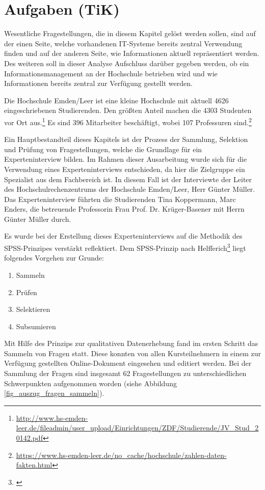 \section{Aufgaben (TiK)}
Wesentliche Fragestellungen, die in diesem Kapitel gelöst werden sollen, sind auf der einen Seite, welche vorhandenen IT-Systeme bereits zentral Verwendung finden und auf der anderen Seite, wie Informationen aktuell repräsentiert werden. Des weiteren soll in dieser Analyse Aufschluss darüber gegeben werden, ob ein Informationsmanagement an der Hochschule betrieben wird und wie Informationen bereits zentral zur Verfügung gestellt werden.

Die Hochschule Emden/Leer ist eine kleine Hochschule mit aktuell 4626 eingeschriebenen Studierenden. Den größten Anteil machen die 4303 Studenten vor Ort aus.\footnote{\url{http://www.hs-emden-leer.de/fileadmin/user_upload/Einrichtungen/ZDF/Studierende/JV_Stud_20142.pdf}} Es sind 396 Mitarbeiter beschäftigt, wobei 107 Professuren sind.\footnote{\url{https://www.hs-emden-leer.de/no_cache/hochschule/zahlen-daten-fakten.html}}

Ein Hauptbestandteil dieses Kapitels ist der Prozess der Sammlung, Selektion und Prüfung von Fragestellungen, welche die Grundlage für ein Experteninterview bilden. Im Rahmen dieser Ausarbeitung wurde sich für die Verwendung eines Experteninterviews entschieden, da hier die Zielgruppe ein Spezialist aus dem Fachbereich ist. In diesem Fall ist der Interviewte der Leiter des Hochschulrechenzentrums der Hochschule Emden/Leer, Herr Günter Müller. Das Experteninterview führten die Studierenden Tina Koppermann, Marc Enders, die betreuende Professorin Frau Prof. Dr. Krüger-Basener mit Herrn Günter Müller durch. 

Es wurde bei der Erstellung dieses Experteninterviews auf die Methodik des SPSS-Prinzipes verstärkt reflektiert. Dem SPSS-Prinzip nach Helfferich\footnote{\cite{helfferich_2009}} liegt folgendes Vorgehen zur Grunde:

\begin{enumerate}
	\item Sammeln
	\item Prüfen
	\item Selektieren
	\item Subsumieren		
\end{enumerate}

Mit Hilfe des Prinzips zur qualitativen Datenerhebung fand im ersten Schritt das Sammeln von Fragen statt. Diese konnten von allen Kursteilnehmern in einem zur Verfügung gestellten Online-Dokument eingesehen und editiert werden. Bei der Sammlung der Fragen sind insgesamt 62 Fragestellungen zu unterschiedlichen Schwerpunkten aufgenommen worden (siehe Abbildung \ref{fig_auszug_fragen_sammeln}).

